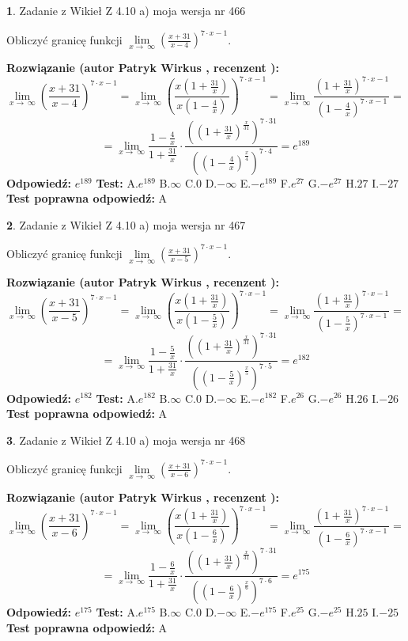 \documentclass[12pt, a4paper]{article}
\theoremstyle{definition} %
\newtheorem{zad}{}
\newcommand{\zadStart}[1]{\begin{zad}#1\newline}
\newcommand{\zadStop}{\end{zad}}
\newcommand{\rozwStart}[2]{\noindent \textbf{Rozwiązanie (autor #1 , recenzent #2): }\newline}
\newcommand{\rozwStop}{\newline}
\newcommand{\odpStart}{\noindent \textbf{Odpowiedź:}\newline}
\newcommand{\odpStop}{\newline}
\newcommand{\testStart}{\noindent \textbf{Test:}\newline}
\newcommand{\testStop}{\newline}
\newcommand{\kluczStart}{\noindent \textbf{Test poprawna odpowiedź:}\newline}
\newcommand{\kluczStop}{\newline}
\begin{document}
\zadStart{Zadanie z Wikieł Z 4.10 a) moja wersja nr 466}

Obliczyć granicę funkcji  $\lim\limits_{x\to\ \infty}(\frac{x+31}{x-4})^{7\cdot x-1}$.
\zadStop
\rozwStart{Patryk Wirkus}{}
$$\lim\limits_{x\to\ \infty}(\frac{x+31}{x-4})^{7\cdot x-1} = \lim\limits_{x\to\ \infty}(\frac{x(1+\frac{31}{x})}{x(1-\frac{4}{x})})^{7\cdot x-1}=\lim\limits_{x\to\ \infty}\frac{(1+\frac{31}{x})^{7\cdot x-1}}{(1-\frac{4}{x})^{7\cdot x-1}}=$$
$$=\lim\limits_{x\to\ \infty}\frac{1-\frac{4}{x}}{1+\frac{31}{x}}\cdot\frac{((1+\frac{31}{x})^{\frac{x}{31}})^{7\cdot31}}{((1-\frac{4}{x})^{\frac{x}{4}})^{7\cdot4}}=e^{189}$$
\rozwStop
\odpStart
$e^{189}$
\odpStop
\testStart
A.$e^{189}$ B.$\infty$ C.$0$ D.$-\infty$ E.$-e^{189}$
F.$e^{27}$ G.$-e^{27}$
H.$27$
I.$-27$
\testStop
\kluczStart
A
\kluczStop



\zadStart{Zadanie z Wikieł Z 4.10 a) moja wersja nr 467}

Obliczyć granicę funkcji  $\lim\limits_{x\to\ \infty}(\frac{x+31}{x-5})^{7\cdot x-1}$.
\zadStop
\rozwStart{Patryk Wirkus}{}
$$\lim\limits_{x\to\ \infty}(\frac{x+31}{x-5})^{7\cdot x-1} = \lim\limits_{x\to\ \infty}(\frac{x(1+\frac{31}{x})}{x(1-\frac{5}{x})})^{7\cdot x-1}=\lim\limits_{x\to\ \infty}\frac{(1+\frac{31}{x})^{7\cdot x-1}}{(1-\frac{5}{x})^{7\cdot x-1}}=$$
$$=\lim\limits_{x\to\ \infty}\frac{1-\frac{5}{x}}{1+\frac{31}{x}}\cdot\frac{((1+\frac{31}{x})^{\frac{x}{31}})^{7\cdot31}}{((1-\frac{5}{x})^{\frac{x}{5}})^{7\cdot5}}=e^{182}$$
\rozwStop
\odpStart
$e^{182}$
\odpStop
\testStart
A.$e^{182}$ B.$\infty$ C.$0$ D.$-\infty$ E.$-e^{182}$
F.$e^{26}$ G.$-e^{26}$
H.$26$
I.$-26$
\testStop
\kluczStart
A
\kluczStop



\zadStart{Zadanie z Wikieł Z 4.10 a) moja wersja nr 468}

Obliczyć granicę funkcji  $\lim\limits_{x\to\ \infty}(\frac{x+31}{x-6})^{7\cdot x-1}$.
\zadStop
\rozwStart{Patryk Wirkus}{}
$$\lim\limits_{x\to\ \infty}(\frac{x+31}{x-6})^{7\cdot x-1} = \lim\limits_{x\to\ \infty}(\frac{x(1+\frac{31}{x})}{x(1-\frac{6}{x})})^{7\cdot x-1}=\lim\limits_{x\to\ \infty}\frac{(1+\frac{31}{x})^{7\cdot x-1}}{(1-\frac{6}{x})^{7\cdot x-1}}=$$
$$=\lim\limits_{x\to\ \infty}\frac{1-\frac{6}{x}}{1+\frac{31}{x}}\cdot\frac{((1+\frac{31}{x})^{\frac{x}{31}})^{7\cdot31}}{((1-\frac{6}{x})^{\frac{x}{6}})^{7\cdot6}}=e^{175}$$
\rozwStop
\odpStart
$e^{175}$
\odpStop
\testStart
A.$e^{175}$ B.$\infty$ C.$0$ D.$-\infty$ E.$-e^{175}$
F.$e^{25}$ G.$-e^{25}$
H.$25$
I.$-25$
\testStop
\kluczStart
A
\kluczStop
\end{document}
